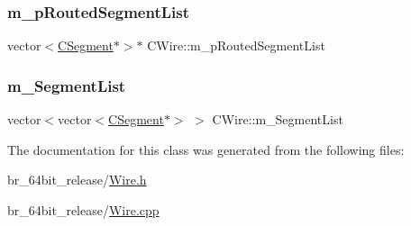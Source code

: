 \subsubsection{\texorpdfstring{m\_pRoutedSegmentList}{m\_pRoutedSegmentList}}
{\footnotesize\ttfamily vector$<$\mbox{\hyperlink{classCSegment}{C\+Segment}}$\ast$$>$$\ast$ C\+Wire\+::m\+\_\+p\+Routed\+Segment\+List}

\mbox{\label{classCWire_ab9e216e49ec590f52cc9a8b45cdf6445}} 
\subsubsection{\texorpdfstring{m\_SegmentList}{m\_SegmentList}}
{\footnotesize\ttfamily vector$<$vector$<$\mbox{\hyperlink{classCSegment}{C\+Segment}}$\ast$$>$ $>$ C\+Wire\+::m\+\_\+\+Segment\+List}



The documentation for this class was generated from the following files\+:\begin{DoxyCompactItemize}
\item 
br\+\_\+64bit\+\_\+release/\mbox{\hyperlink{Wire_8h}{Wire.\+h}}\item 
br\+\_\+64bit\+\_\+release/\mbox{\hyperlink{Wire_8cpp}{Wire.\+cpp}}\end{DoxyCompactItemize}
